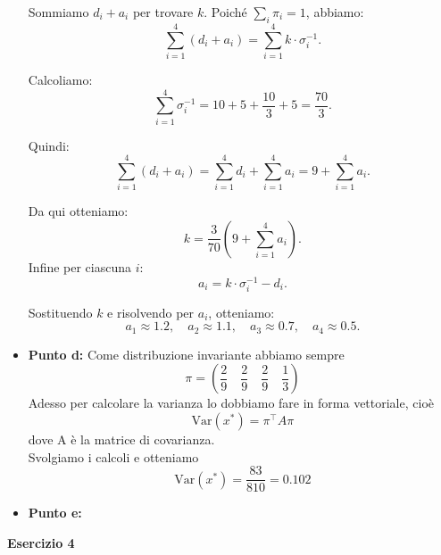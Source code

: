 \documentclass[a4paper,12pt]{article}
\begin{document}
\begin{itemize}
		Sommiamo \(d_i + a_i\) per trovare \(k\). Poiché \(\sum_i \pi_i = 1\), abbiamo:
		\[
		\sum_{i=1}^4 (d_i + a_i) = \sum_{i=1}^4 k \cdot \sigma_i^{-1}.
		\]
		
		Calcoliamo:
		\[
		\sum_{i=1}^4 \sigma_i^{-1} = 10 + 5 + \frac{10}{3} + 5 = \frac{70}{3}.
		\]
		
		Quindi:
		\[
		\sum_{i=1}^4 (d_i + a_i) = \sum_{i=1}^4 d_i + \sum_{i=1}^4 a_i = 9 + \sum_{i=1}^4 a_i.
		\]
		
		Da qui otteniamo:
		\[
		k =\frac{3}{70} (9 + \sum_{i=1}^4 a_i).
		\]
		Infine per ciascuna \(i\):
		\[
		a_i = k \cdot \sigma_i^{-1} - d_i.
		\]
		
		Sostituendo \(k\) e risolvendo per \(a_i\), otteniamo:
		\[
		a_1 \approx 1.2, \quad a_2 \approx 1.1, \quad a_3 \approx 0.7, \quad a_4 \approx 0.5.
		\]
		
		\item \textbf{Punto d: }
		Come distribuzione invariante abbiamo sempre\\
		\[
		\pi = \left( \frac{2}{9} \quad \frac{2}{9} \quad \frac{2}{9} \quad \frac{1}{3} \right)
		\]
		Adesso per calcolare la varianza lo dobbiamo fare in forma vettoriale, cioè\\
		\[
		\text{Var}(x^*) = \pi^\top A \pi
		\]
		dove A è la matrice di covarianza.\\
		Svolgiamo i calcoli e otteniamo\\
		\[
		\text{Var}(x^*) = \frac{83}{810}=0.102
		\]
		\item \textbf{Punto e: }
		
	\end{itemize}
	\centering \textbf{Esercizio 4}\\
\end{document}
